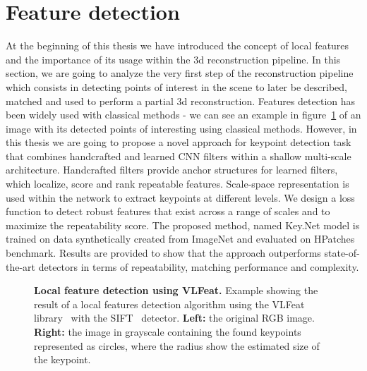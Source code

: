 \section{Feature detection}

At the beginning of this thesis we have introduced the concept of local features and the importance of its usage within the 3d reconstruction pipeline. In this section, we are going to analyze the very first step of the reconstruction pipeline which consists in detecting points of interest in the scene to later be described, matched and used to perform a partial 3d reconstruction. Features detection has been widely used with classical methods - we can see an example in figure~\ref{keynet_fig:feature_detection_example} of an image with its detected points of interesting using classical methods. However, in this thesis we are going to propose a novel approach for keypoint detection task that combines handcrafted and learned CNN filters within a shallow multi-scale architecture. Handcrafted filters provide anchor structures for learned filters, which localize, score and rank repeatable features. Scale-space representation is used within the network to extract keypoints at different levels. We design a loss function to detect robust features that exist across a range of scales and to maximize the repeatability score. The proposed method, named Key.Net model is trained on data synthetically created from ImageNet and evaluated on HPatches benchmark. Results are provided to show that the approach outperforms state-of-the-art detectors in terms of repeatability, matching performance and complexity.

\begin{figure}
    \centering
    \qquad
    \caption[Local feature detection using VLFeat]{\textbf{Local feature detection using VLFeat.} Example showing the result of a local features detection algorithm using the VLFeat library~\cite{vedaldi08vlfeat} with the SIFT~\cite{SIFT} detector. \textbf{Left:} the original RGB image. \textbf{Right:} the image in grayscale containing the found keypoints represented as circles, where the radius show the estimated size of the keypoint.}
    \label{keynet_fig:feature_detection_example}
\end{figure}

